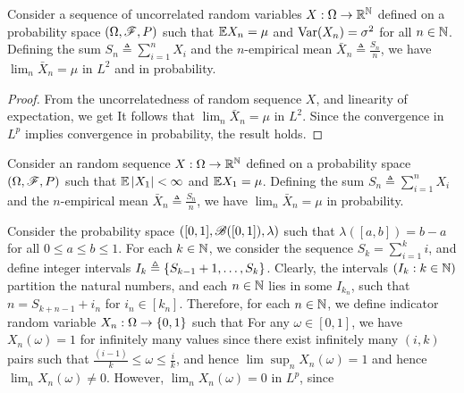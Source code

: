 \documentclass[letterpaper,10pt,english]{article}
\begin{document}
\begin{thm} 
Consider a sequence of uncorrelated random variables $X:\Omega\to\mathbb{R}^{\mathbb{N}}$ defined on a probability space $(\Omega,\mathscr{F}, P)$ such that $\mathbb{E} X_n = \mu$ and $\operatorname{Var}(X_n) = \sigma^2$ for all $n \in \mathbb{N}$. 
Defining the sum $S_n\triangleq \sum_{i=1}^nX_i$ and the $n$-empirical mean $\bar{X}_n \triangleq \frac{S_n}{n}$, 
we have $\lim_n\bar{X}_n=\mu$ in $L^2$ and in probability.
\end{thm}
\begin{proof} 
From the uncorrelatedness of random sequence $X$, 
and linearity of expectation, we get
It follows that $\lim_n\bar{X}_n = \mu$ in $L^2$. 
Since the convergence in $L^p$ implies convergence in probability, the result holds.
\end{proof}
\begin{thm} 
Consider an \iid random sequence $X:\Omega\to\mathbb{R}^{\mathbb{N}}$ defined on a probability space $(\Omega,\mathscr{F}, P)$ such that $\mathbb{E}\left\lvert X_1\right\rvert< \infty$ and $\mathbb{E} X_1 = \mu$. 
Defining the sum $S_n\triangleq \sum_{i=1}^nX_i$ and the $n$-empirical mean $\bar{X}_n \triangleq \frac{S_n}{n}$, 
we have $\lim_n\bar{X}_n=\mu$ in probability.
\end{thm}
\begin{shaded*}
\begin{exmp} 
Consider the probability space $([0,1], \mathscr{B}([0,1]), \lambda)$ such that $\lambda([a,b]) = b-a$ for all $0 \le a \le b \le 1$. 
For each $k \in \mathbb{N}$, we consider the sequence $S_k = \sum_{i=1}^ki$, and define integer intervals $I_k \triangleq \left\{S_{k-1}+1, \dots, S_{k}\right\}$. 
Clearly, the intervals $(I_k:k \in \mathbb{N})$ partition the natural numbers, 
and each $n \in \mathbb{N}$ lies in some $I_{k_n}$, such that $n = S_{k+n-1}+i_n$ for $i_n \in [k_n]$. 
Therefore, for each $n \in \mathbb{N}$, we define indicator random variable $X_n: \Omega \to \left\{0,1\right\}$ such that 
For any $\omega \in [0,1]$, we have $X_n(\omega) = 1$ for infinitely many values since there exist infinitely many $(i,k)$ pairs such that $\frac{(i-1)}{k} \le \omega \le \frac{i}{k}$, 
and hence $\lim\sup_nX_n(\omega) = 1$ and hence $\lim_nX_n(\omega) \neq 0$. 
However, $\lim_nX_n(\omega) = 0$ in $L^p$, since 
\end{exmp}
\end{shaded*}
\end{document}
